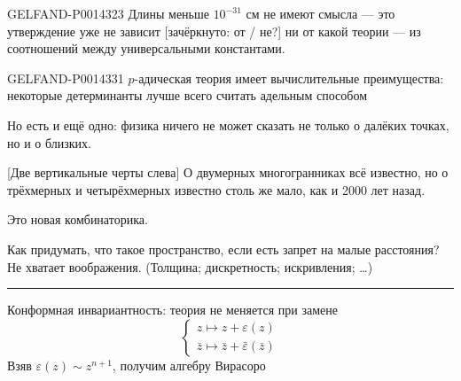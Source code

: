 \begin{GelfandAdjacentEvidence}{GELFAND-P001432}{3}
Длины меньше \(10^{-31}\) см не имеют смысла — это утверждение уже не зависит [зачёркнуто: от / не?]
ни от какой теории — из соотношений между универсальными константами.
\end{GelfandAdjacentEvidence}



\begin{GelfandAdjacentEvidence}{GELFAND-P001433}{1}
\(p\)-адическая теория имеет вычислительные преимущества: некоторые детерминанты лучше всего считать адельным способом

Но есть и ещё одно: физика ничего не может сказать не только о далёких точках, но и о близких.

[Две вертикальные черты слева]
О двумерных многогранниках всё известно, но о трёхмерных и четырёхмерных известно столь же мало, как и 2000 лет назад.

Это новая комбинаторика.
\end{GelfandAdjacentEvidence}



Как придумать, что такое пространство, если есть запрет на малые расстояния? Не хватает воображения. (Толщина; дискретность; искривления; \ldots)

\begin{center}
\rule{1.5cm}{.35pt}
\end{center}

Конформная инвариантность: теория не меняется при замене
\begin{equation*}
\tag{22}
\begin{cases}
z\mapsto z+\varepsilon(z)\\
\bar z\mapsto\bar z+\bar\varepsilon(\bar z)
\end{cases}
\end{equation*}
Взяв \(\varepsilon(z)\sim z^{n+1}\), получим алгебру Вирасоро

